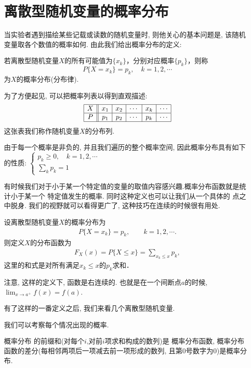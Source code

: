 \section{离散型随机变量的概率分布}
当实验者遇到描绘某些记载或读数的随机变量时, 则他关心的基本问题是, 该随机变量取各个数值的概率如何. 由此我们给出概率分布的定义:
\begin{definition}[概率分布]
    若离散型随机变量$X$的所有可能值为$\{x_k\}$，分别对应概率$\{p_k\}$，则称
    $$P\{X=x_k\}=p_k, \quad k=1,2,\cdots$$
    为$X$的概率分布(分布律).
\end{definition}

为了方便起见, 可以把概率列表以得到直观描述:
\[\begin{array}{|c||c|c|c|c|c|}\hline
        X & x_1 & x_2 & \cdots & x_k & \cdots \\ \hline
        P & p_1 & p_2 & \cdots & p_k & \cdots \\ \hline
    \end{array}\]
这张表我们称作随机变量$X$的分布列.

由于每一个概率是非负的, 并且我们遍历的整个概率空间, 因此概率分布具有如下的性质:
$\displaystyle \left\{ \begin{array}{l} p_k\ge 0, \quad k=1,2,\cdots \\
        \sum\limits_{k}{p_k}=1\end{array} \right.$

有时候我们对于小于某一个特定值的变量的取值内容感兴趣.概率分布函数就是统计小于某一个
特定值发生的概率.
同时这种定义也可以让我们从一个具体的
点之中脱身. 我们的视野就可以看得更广了, 这种技巧在连续的时候很有用处.

\begin{definition}[概率分布函数]
    设离散型随机变量$X$的概率分布为
    \begin{align*}
        P\{X=x_k\}=p_k,\qquad k=1,2,\cdots.
    \end{align*}
    则定义$X$的分布函数为
    \begin{align*}
        F_X(x)=P\{X\le x\}=\sum_{x_k\le x} p_k,
    \end{align*}
    这里的和式是对所有满足$x_k\le x$的$p_k$求和．
\end{definition}

注意, 这样的定义下, 函数是右连续的. 也就是在一个间断点$a$的时候, 
$\lim_{x\to a^+}f(x)=f(a)$.

有了这样的一番定义之后, 我们来看几个离散型随机变量.

\begin{takeaway}
    
    我们可以考察每个情况出现的概率. 

    概率分布 的前缀和(对每个$i$,对前$i$项求和构成的数列)是 概率分布函数, 概率分布函数的差分(每相邻两项后一项减去前一项形成的数列, 且第0号数字为0)是概率分布. 
\end{takeaway}

